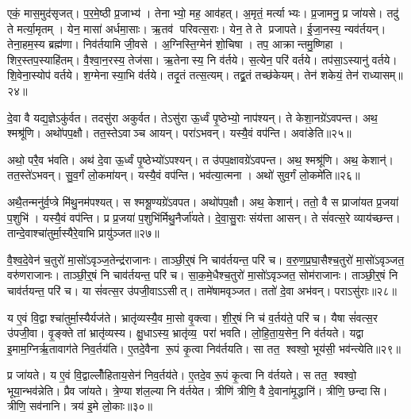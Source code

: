 एकं॒ मास॒मुद॑सृजत्।
प॒र॒मे॒ष्ठी प्र॒जाभ्य॑।
तेनाभ्यो॒ मह॒ आव॑हत्।
अ॒मृतं॒ मर्त्याभ्यः।
प्र॒जामनु॒ प्र जा॑यसे।
तदु॑ ते मर्त्या॒मृतम्।
येन॒ मासा॑ अर्धमा॒साः।
ऋ॒तव॑ परिवत्स॒राः।
येन॒ ते ते प्रजापते।
ई॒जा॒नस्य॒ न्यव॑र्तयन्।
तेना॒हम॒स्य ब्रह्म॑णा।
निव॑र्तयामि जी॒वसे।
अ॒ग्निस्ति॒ग्मेन॑ शो॒चिषा।
तप॒ आक्रान्तमु॒ष्णिहा।
शिर॒स्तप॒स्याहि॑तम्।
वै॒श्वा॒न॒रस्य॒ तेज॑सा।
ऋ॒तेनास्य॒ नि व॑र्तये।
स॒त्येन॒ परि॑ वर्तये।
तप॑सा॒ऽस्यानु॑ वर्तये।
शि॒वेना॒स्योप॑ वर्तये।
श॒ग्मेनास्या॒भि व॑र्तये।
तदृ॒तं तत्स॒त्यम्।
तद्व्र॒तं तच्छ॑केयम्।
तेन॑ शकेयं॒ तेन॑ राध्यासम्॥२४॥

दे॒वा वै यद्य॒ज्ञेऽकु॑र्वत।
तदसु॑रा अकुर्वत।
तेऽसु॑रा ऊ॒र्ध्वं पृ॒ष्ठेभ्यो॒ नाप॑श्यन्।
ते केशा॒नग्रे॑ऽवपन्त।
अथ॒ श्मश्रू॑णि।
अथो॑पप॒क्षौ।
तत॒स्तेऽवाञ्च आयन्।
परा॑ऽभवन्।
यस्यै॒वं वप॑न्ति।
अवा॑ङेति॥२५॥

अथो॒ परै॒व भ॑वति।
अथ॑ दे॒वा ऊ॒र्ध्वं पृ॒ष्ठेभ्यो॑ऽपश्यन्।
त उ॑पप॒क्षावग्रे॑ऽवपन्त।
अथ॒ श्मश्रू॑णि।
अथ॒ केशान्॑।
तत॒स्ते॑ऽभवन्।
सु॒व॒र्गं लो॒कमा॑यन्।
यस्यै॒वं वप॑न्ति।
भव॑त्या॒त्मना।
अथो॑ सुव॒र्गं लो॒कमे॑ति॥२६॥

अथै॒तन्मनु॑र्व॒प्त्रे मि॑थु॒नम॑पश्यत्।
स श्मश्रू॒ण्यग्रे॑ऽवपत।
अथो॑पप॒क्षौ।
अथ॒ केशान्॑।
ततो॒ वै स प्राजा॑यत प्र॒जया॑ प॒शुभि॑।
यस्यै॒वं वप॑न्ति।
प्र प्र॒जया॑ प॒शुभि॑र्मिथु॒नैर्जा॑यते।
दे॒वा॒सु॒राः संय॑त्ता आसन्।
ते सं॑वत्स॒रे व्याय॑च्छन्त।
तान्दे॒वाश्चा॑तुर्मा॒स्यैरे॒वाभि प्रायु॑ञ्जत॥२७॥

वै॒श्व॒दे॒वेन॑ च॒तुरो॑ मा॒सो॑ऽवृञ्ज॒तेन्द्र॑राजानः।
ताञ्छी॒र्॒षं नि चाव॑र्तयन्त॒ परि॑ च।
व॒रु॒ण॒प्र॒घा॒सैश्च॒तुरो॑ मा॒सो॑ऽवृञ्जत॒ वरु॑णराजानः।
ताञ्छी॒र्॒षं नि चाव॑र्तयन्त॒ परि॑ च।
सा॒क॒मे॒धैश्च॒तुरो॑ मा॒सो॑ऽवृञ्जत॒ सोम॑राजानः।
ताञ्छी॒र्॒षं नि चाव॑र्तयन्त॒ परि॑ च।
या सं॑वत्स॒र उ॑पजी॒वाऽऽसीत्।
तामे॑षामवृञ्जत।
ततो॑ दे॒वा अभ॑वन्।
पराऽसु॑राः॥२८॥

य ए॒वं वि॒द्वाश्चा॑तुर्मा॒स्यैर्यज॑ते।
भ्रातृ॑व्यस्यै॒व मा॒सो वृ॒क्त्वा।
शी॒र्॒षं नि च॑ व॒र्तय॑ते॒ परि॑ च।
यैषा सं॑वत्स॒र उ॑पजी॒वा।
वृ॒ङ्क्ते तां भ्रातृ॑व्यस्य।
क्षु॒धाऽस्य॒ भ्रातृ॑व्य॒ परा॑ भवति।
लो॒हि॒ता॒य॒सेन॒ नि व॑र्तयते।
यद्वा इ॒माम॒ग्निर्\mbox{}ऋ॒तावाग॑ते निव॒र्तय॑ति।
ए॒तदे॒वैना रू॒पं कृ॒त्वा निव॑र्तयति।
सा तत॒ श्वश्वो॒ भूय॑सी॒ भव॑न्त्येति॥२९॥

प्र जा॑यते।
य ए॒वं वि॒द्वाल्लोँ॑हिताय॒सेन॑ निव॒र्तय॑ते।
ए॒तदे॒व रू॒पं कृ॒त्वा नि व॑र्तयते।
स तत॒ श्वश्वो॒ भूया॒न्भव॑न्नेति।
प्रैव जा॑यते।
त्रे॒ण्या श॑ल॒ल्या नि व॑र्तयेत।
त्रीणि॑ त्रीणि॒ वै दे॒वाना॑मृ॒द्धानि॑।
त्रीणि॒ छन्दासि।
त्रीणि॒ सव॑नानि।
त्रय॑ इ॒मे लो॒काः॥३०॥

